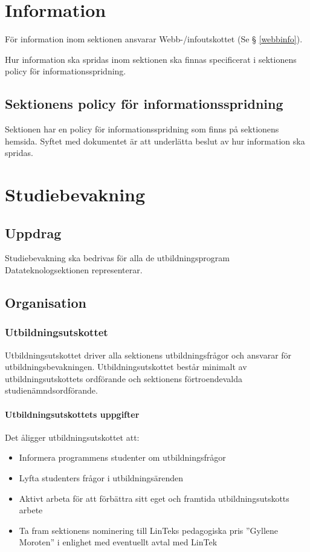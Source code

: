 \documentclass{datateknologsektionen-document}
\begin{document}
\section{Information}
För information inom sektionen ansvarar Webb-/infoutskottet (Se § \ref{webbinfo}).

Hur information ska spridas inom sektionen ska finnas specificerat i sektionens policy för
informationsspridning.
\subsection{Sektionens policy för informationsspridning}
Sektionen har en policy för informationsspridning som finns på sektionens hemsida. Syftet med
dokumentet är att underlätta beslut av hur information ska spridas.
\section{Studiebevakning}
\subsection{Uppdrag}
Studiebevakning ska bedrivas för alla de utbildningsprogram Datateknologsektionen representerar.
\subsection{Organisation}
\subsubsection{Utbildningsutskottet}
\label{utbu}
Utbildningsutskottet driver alla sektionens utbildningsfrågor och ansvarar för
utbildningsbevakningen. Utbildningsutskottet består minimalt av utbildningsutskottets
ordförande och sektionens förtroendevalda studienämndsordförande.
\paragraph{Utbildningsutskottets uppgifter}
Det åligger utbildningsutskottet att:
\begin{itemize}
  \item Informera programmens studenter om utbildningsfrågor
  \item Lyfta studenters frågor i utbildningsärenden
  \item Aktivt arbeta för att förbättra sitt eget och framtida utbildningsutskotts arbete
  \item Ta fram sektionens nominering till LinTeks pedagogiska pris ”Gyllene Moroten” i enlighet med eventuellt avtal med LinTek
\end{itemize}
\end{document}
